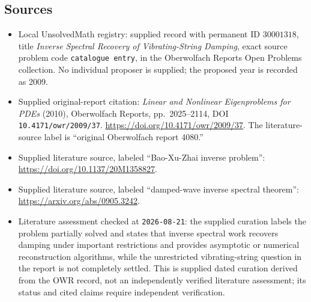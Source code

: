 \documentclass[11pt]{article}
\begin{document}
\subsection{Sources}
\begin{itemize}
\item Local UnsolvedMath registry: supplied record with permanent ID \(30001318\), title \emph{Inverse Spectral Recovery of Vibrating-String Damping}, exact source problem code \texttt{catalogue entry}, in the Oberwolfach Reports Open Problems collection. No individual proposer is supplied; the proposed year is recorded as 2009.
\item Supplied original-report citation: \emph{Linear and Nonlinear Eigenproblems for PDEs} (2010), Oberwolfach Reports, pp.\ 2025--2114, DOI \texttt{10.4171/owr/2009/37}. \url{https://doi.org/10.4171/owr/2009/37}. The literature-source label is ``original Oberwolfach report 4080.''
\item Supplied literature source, labeled ``Bao-Xu-Zhai inverse problem'': \url{https://doi.org/10.1137/20M1358827}.
\item Supplied literature source, labeled ``damped-wave inverse spectral theorem'': \url{https://arxiv.org/abs/0905.3242}.
\item Literature assessment checked at \texttt{2026-08-21}: the supplied curation labels the problem partially solved and states that inverse spectral work recovers damping under important restrictions and provides asymptotic or numerical reconstruction algorithms, while the unrestricted vibrating-string question in the report is not completely settled. This is supplied dated curation derived from the OWR record, not an independently verified literature assessment; its status and cited claims require independent verification.
\end{itemize}
\end{document}
